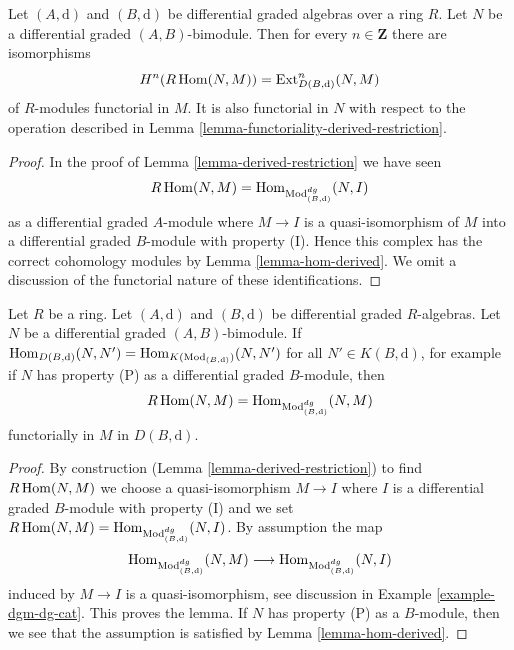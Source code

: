 \begin{lemma}
\label{lemma-derived-restriction-exts}
Let $(A, \text{d})$ and $(B, \text{d})$ be differential graded algebras
over a ring $R$. Let $N$ be a differential graded $(A, B)$-bimodule.
Then for every $n \in \mathbf{Z}$ there are isomorphisms
$$
H^n(R\mathop{\mathrm{Hom}}\nolimits(N, M)) = \mathop{\mathrm{Ext}}\nolimits^n_{D(B, \text{d})}(N, M)
$$
of $R$-modules functorial in $M$. It is also functorial in $N$
with respect to the operation described in
Lemma \ref{lemma-functoriality-derived-restriction}.
\end{lemma}

\begin{proof}
In the proof of Lemma \ref{lemma-derived-restriction}
we have seen
$$
R\mathop{\mathrm{Hom}}\nolimits(N, M) = 
\mathop{\mathrm{Hom}}\nolimits_{\text{Mod}^{dg}_{(B, \text{d})}}(N, I)
$$
as a differential graded $A$-module
where $M \to I$ is a quasi-isomorphism of $M$ into a differential
graded $B$-module with property (I). Hence this complex has the
correct cohomology modules by Lemma \ref{lemma-hom-derived}.
We omit a discussion of the functorial nature of these
identifications.
\end{proof}

\begin{lemma}
\label{lemma-compute-derived-restriction}
Let $R$ be a ring. Let $(A, \text{d})$ and $(B, \text{d})$ be
differential graded $R$-algebras. Let $N$ be a differential
graded $(A, B)$-bimodule. If
$\mathop{\mathrm{Hom}}\nolimits_{D(B, \text{d})}(N, N') = \mathop{\mathrm{Hom}}\nolimits_{K(\text{Mod}_{(B, \text{d})})}(N, N')$
for all $N' \in K(B, \text{d})$, for example if $N$
has property (P) as a differential graded $B$-module, then
$$
R\mathop{\mathrm{Hom}}\nolimits(N, M) = \mathop{\mathrm{Hom}}\nolimits_{\text{Mod}^{dg}_{(B, \text{d})}}(N, M)
$$
functorially in $M$ in $D(B, \text{d})$.
\end{lemma}

\begin{proof}
By construction (Lemma \ref{lemma-derived-restriction})
to find $R\mathop{\mathrm{Hom}}\nolimits(N, M)$ we choose a quasi-isomorphism
$M \to I$ where $I$ is a differential graded $B$-module
with property (I) and we set
$R\mathop{\mathrm{Hom}}\nolimits(N, M) = \mathop{\mathrm{Hom}}\nolimits_{\text{Mod}^{dg}_{(B, \text{d})}}(N, I)$.
By assumption the map
$$
\mathop{\mathrm{Hom}}\nolimits_{\text{Mod}^{dg}_{(B, \text{d})}}(N, M) \longrightarrow
\mathop{\mathrm{Hom}}\nolimits_{\text{Mod}^{dg}_{(B, \text{d})}}(N, I)
$$
induced by $M \to I$ is a quasi-isomorphism, see discussion in
Example \ref{example-dgm-dg-cat}. This proves the lemma.
If $N$ has property (P) as a $B$-module, then we see that the
assumption is satisfied by Lemma \ref{lemma-hom-derived}.
\end{proof}




